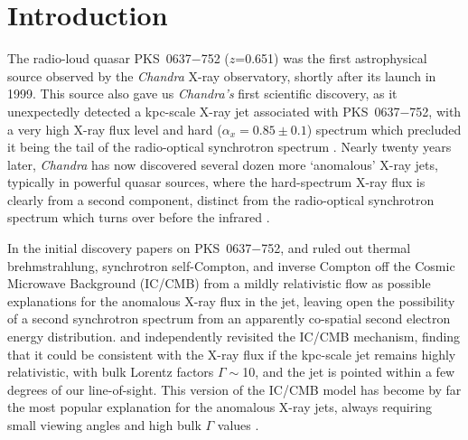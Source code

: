 \documentclass[twocolumn]{aastex61}
\begin{document}


\section{Introduction}
The radio-loud quasar PKS~0637$-$752 ($z$=0.651) was the first astrophysical
source observed by the \emph{Chandra} X-ray observatory, shortly after
its launch in 1999. This source also gave us \emph{Chandra's} first
scientific discovery, as it unexpectedly detected a kpc-scale X-ray
jet associated with PKS~0637$-$752, with a very high X-ray flux level
and hard ($\alpha_x=0.85\pm0.1$) spectrum which precluded it being the
tail of the radio-optical synchrotron spectrum
\citep{chartas2000,schwartz2000}. Nearly twenty years later,
\emph{Chandra} has now discovered several dozen more `anomalous' X-ray
jets, typically in powerful quasar sources, where the hard-spectrum
X-ray flux is clearly from a second component, distinct from the
radio-optical synchrotron spectrum which turns over before the
infrared \citep[see, e.g.,][for reviews]{harris2006,hardcastle2006}.

In the initial discovery papers on PKS~0637$-$752,
\cite{schwartz2000} and \cite{chartas2000} ruled out thermal brehmstrahlung, synchrotron
self-Compton, and inverse Compton off the Cosmic Microwave Background (IC/CMB) from a mildly
relativistic flow as possible explanations for the anomalous X-ray
flux in the jet, leaving open the possibility of a second synchrotron
spectrum from an apparently co-spatial second electron energy
distribution. \cite{tavecchio2000} and \cite{celotti2001}
independently revisited the IC/CMB mechanism, finding that it could be
consistent with the X-ray flux if the kpc-scale jet remains highly
relativistic, with bulk Lorentz factors $\Gamma\sim$10, and the jet is
pointed within a few degrees of our line-of-sight. This version of the
IC/CMB model has become by far the most popular explanation for the
anomalous X-ray jets, always requiring small viewing angles and
high bulk $\Gamma$ values
\citep[e.g.,][]{sambruna2004,jorstad2006,miller2006,marshall2011,perlman2011,godfrey2012,kharb2012,stanley2015}.
\end{document}
